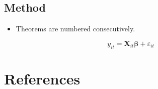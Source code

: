 \documentclass[
11pt,notheorems,hyperref={pdfauthor=Maghfira Ramadhani}
]{beamer}
\begin{document}
\subsection{Method}
\begin{frame}
    \begin{itemize}
        \item Theorems are numbered consecutively.
    \end{itemize}
    \begin{equation}
        y_{it}=\textbf{X}_{it}\pmb{\beta}+\varepsilon_{it}
    \end{equation}
\end{frame}

\section{References}
\begin{frame}[allowframebreaks]
    \printbibliography
\end{frame}
\end{document}
